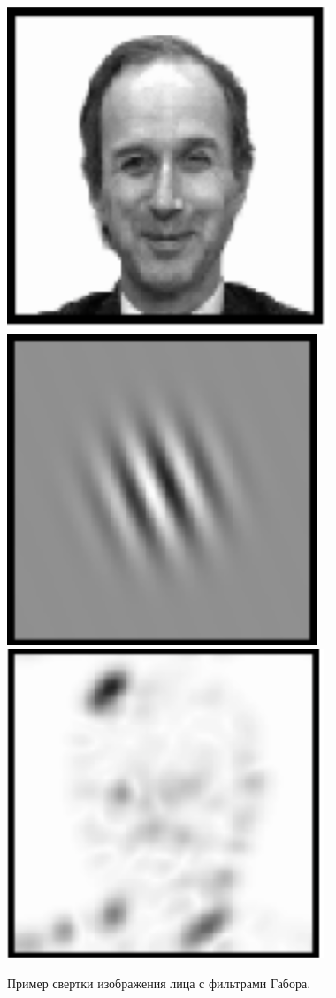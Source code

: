 \begin{figure}[h]
    \centering
    \includegraphics[height=0.15\textheight]{img/gbr1.png}
    \includegraphics[height=0.15\textheight]{img/gbr2.png}
    \includegraphics[height=0.15\textheight]{img/gbr3.png}
    \caption{Пример свертки изображения лица с фильтрами Габора.}
    \label{img:gab}
\end{figure}


